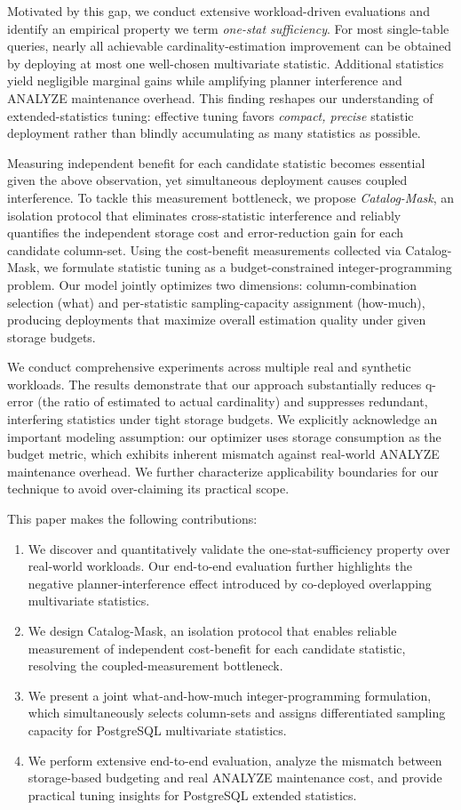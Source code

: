 \documentclass[sigconf, nonacm]{acmart}
\begin{document}
Motivated by this gap, we conduct extensive workload-driven evaluations and
identify an empirical property we term \emph{one-stat sufficiency}. For most
single-table queries, nearly all achievable cardinality-estimation improvement
can be obtained by deploying at most one well-chosen multivariate statistic.
Additional statistics yield negligible marginal gains while amplifying planner
interference and ANALYZE maintenance overhead. This finding reshapes our
understanding of extended-statistics tuning: effective tuning favors
\emph{compact, precise} statistic deployment rather than blindly accumulating
as many statistics as possible.

Measuring independent benefit for each candidate statistic becomes essential
given the above observation, yet simultaneous deployment causes coupled
interference. To tackle this measurement bottleneck, we propose
\emph{Catalog-Mask}, an isolation protocol that eliminates cross-statistic
interference and reliably quantifies the independent storage cost and
error-reduction gain for each candidate column-set. Using the cost-benefit
measurements collected via Catalog-Mask, we formulate statistic tuning as a
budget-constrained integer-programming problem. Our model jointly optimizes two
dimensions: column-combination selection (what) and per-statistic
sampling-capacity assignment (how-much), producing deployments that maximize
overall estimation quality under given storage budgets.

We conduct comprehensive experiments across multiple real and synthetic
workloads. The results demonstrate that our approach substantially reduces
q-error (the ratio of estimated to actual cardinality) and suppresses
redundant, interfering statistics under tight storage
budgets. We explicitly acknowledge an important modeling assumption: our
optimizer uses storage consumption as the budget metric, which exhibits
inherent mismatch against real-world ANALYZE maintenance overhead. We further
characterize applicability boundaries for our technique to avoid over-claiming
its practical scope.

This paper makes the following contributions:
\begin{enumerate}
\item We discover and quantitatively validate the one-stat-sufficiency property
over real-world workloads. Our end-to-end evaluation further highlights the
negative planner-interference effect introduced by co-deployed overlapping
multivariate statistics.
\item We design Catalog-Mask, an isolation protocol that enables reliable
measurement of independent cost-benefit for each candidate statistic, resolving
the coupled-measurement bottleneck.
\item We present a joint what-and-how-much integer-programming formulation,
which simultaneously selects column-sets and assigns differentiated sampling
capacity for PostgreSQL multivariate statistics.
\item We perform extensive end-to-end evaluation, analyze the mismatch between
storage-based budgeting and real ANALYZE maintenance cost, and provide
practical tuning insights for PostgreSQL extended statistics.
\end{enumerate}
\end{document}
